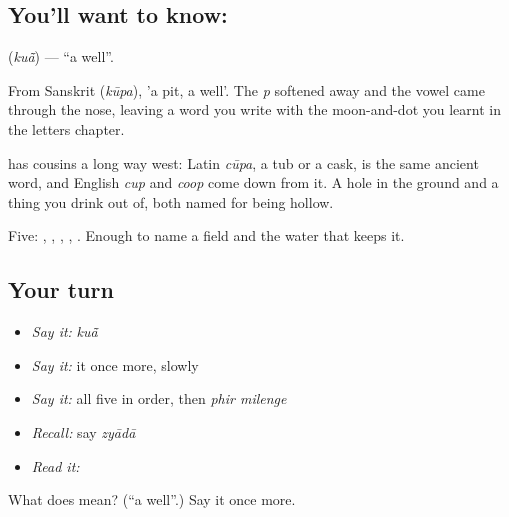 \subsection*{You'll want to know: }
\textbf{} (\emph{kuā̃}) — \textquotedblleft{}a well\textquotedblright{}.

From Sanskrit  (\emph{kūpa}), 'a pit, a well'. The \emph{p} softened away and the vowel came through the nose, leaving a word you write with the moon-and-dot you learnt in the letters chapter.

 has cousins a long way west: Latin \emph{cūpa}, a tub or a cask, is the same ancient word, and English \emph{cup} and \emph{coop} come down from it. A hole in the ground and a thing you drink out of, both named for being hollow.

\begin{grammarlens}[title={What you've built}]
Five: , , , , . Enough to name a field and the water that keeps it.
\end{grammarlens}

\subsection*{Your turn}
\begin{itemize}
\raggedright
  \item \emph{Say it:} \emph{kuā̃}
  \item \emph{Say it:} it once more, slowly
  \item \emph{Say it:} all five in order, then \emph{phir milenge}
  \item \emph{Recall:} say \emph{zyādā}
  \item \emph{Read it:} \textbf{}
\end{itemize}

\begin{tcolorbox}[breakable,colback=teal!4,colframe=teal!35!black,title={Before you move on}]
What does  mean? (\textquotedblleft{}a well\textquotedblright{}.) Say it once more.
\end{tcolorbox}
